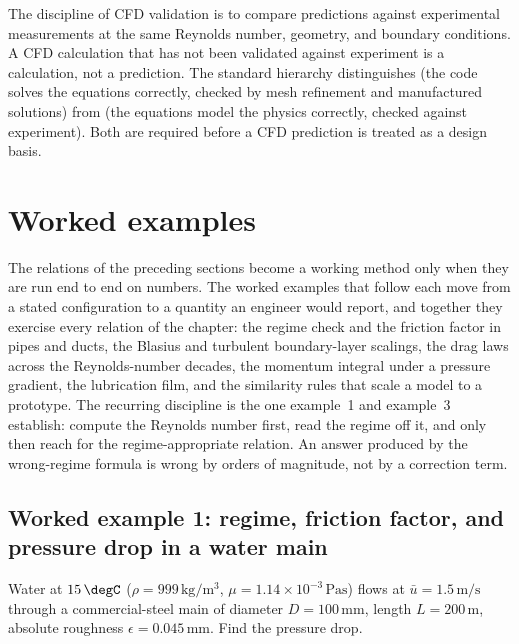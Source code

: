 The discipline of CFD validation is to compare predictions
against experimental measurements at the same Reynolds number,
geometry, and boundary conditions. A CFD calculation that has
not been validated against experiment is a calculation, not a
prediction. The standard 
hierarchy distinguishes  (the code solves
the equations correctly, checked by mesh refinement and
manufactured solutions) from  (the equations
model the physics correctly, checked against experiment). Both
are required before a CFD prediction is treated as a design
basis.

\section{Worked examples}

The relations of the preceding sections become a working method
only when they are run end to end on numbers. The worked examples
that follow each move from a stated configuration to a quantity an
engineer would report, and together they exercise every relation of
the chapter: the regime check and the friction factor in pipes and
ducts, the Blasius and turbulent boundary-layer scalings, the drag
laws across the Reynolds-number decades, the momentum integral under
a pressure gradient, the lubrication film, and the similarity rules
that scale a model to a prototype. The recurring discipline is the
one example~1 and example~3 establish: compute the Reynolds number
first, read the regime off it, and only then reach for the
regime-appropriate relation. An answer produced by the wrong-regime
formula is wrong by orders of magnitude, not by a correction term.

\subsection*{Worked example 1: regime, friction factor, and pressure drop in a water main}

Water at $15\,\degC$ ($\rho = 999\,\si{\kilogram\per\meter\cubed}$,
$\mu = 1.14\times10^{-3}\,\si{\pascal\second}$) flows at
$\bar u = 1.5\,\si{\meter\per\second}$ through a commercial-steel
main of diameter $D = 100\,\si{\milli\meter}$, length $L = 200\,\si{
\meter}$, absolute roughness $\epsilon = 0.045\,\si{\milli\meter}$.
Find the pressure drop.

